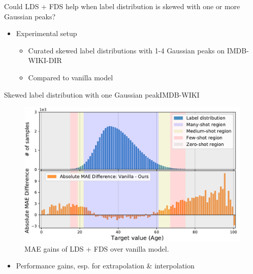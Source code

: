 
\begin{frame}{Could LDS + FDS help when label distribution is skewed with one or more Gaussian peaks?}
	\begin{itemize}\setlength\itemsep{1.5em}
		\item Experimental setup
		\begin{itemize}
			\item Curated skewed label distributions with 1-4 Gaussian peaks on IMDB-WIKI-DIR
			\item Compared to vanilla model
		\end{itemize}
	\end{itemize}
\end{frame}

\begin{frame}{Skewed label distribution with one Gaussian peak}{IMDB-WIKI}
	\begin{figure}[h]
		\includegraphics[width=0.7\linewidth]{images/interp_extrap_diff_peak1.pdf}
		\caption{MAE gains of LDS + FDS over vanilla model.}
	\end{figure}
	\begin{itemize}
		\item Performance gains, esp. for extrapolation \& interpolation
	\end{itemize}
\end{frame}

